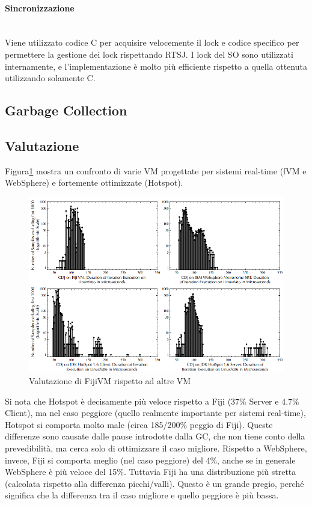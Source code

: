 \paragraph{Sincronizzazione} \mbox{} \\
Viene utilizzato codice C per acquisire velocemente il lock e codice specifico per permettere la gestione dei lock rispettando RTSJ. I lock del SO sono utilizzati internamente, e l'implementazione è molto più efficiente rispetto a quella ottenuta utilizzando solamente C.

\subsection{Garbage Collection}

\subsection{Valutazione}
Figura\ref{fig:fijicomp} mostra un confronto di varie VM progettate per sistemi real-time (fVM e WebSphere) e fortemente ottimizzate (Hotspot). 
\begin{figure}[h]
	\centering
	\includegraphics[width=0.8\linewidth]{images/fijicomp}
	\caption[Valutazione rispetto ad altre VM]{Valutazione di FijiVM rispetto ad altre VM}
	\label{fig:fijicomp}
\end{figure}

Si nota che Hotspot è decisamente più veloce rispetto a Fiji (37\% Server e 4.7\% Client), ma nel caso peggiore (quello realmente importante per sistemi real-time), Hotspot si comporta molto male (circa 185/200\% peggio di Fiji). Queste differenze sono causate dalle pause introdotte dalla GC, che non tiene conto della prevedibilità, ma cerca solo di ottimizzare il caso migliore. Rispetto a WebSphere, invece, Fiji si comporta meglio (nel caso peggiore) del 4\%, anche se in generale WebSphere è più veloce del 15\%. Tuttavia Fiji ha una distribuzione più stretta (calcolata rispetto alla differenza picchi/valli). Questo è un grande pregio, perché significa che la differenza tra il caso migliore e quello peggiore è più bassa.

